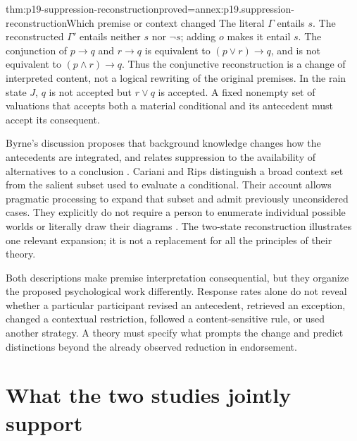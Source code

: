\begin{hblemma}{thm:p19-suppression-reconstruction}{proved=annex:p19.suppression-reconstruction}{Which premise or context changed}
The literal \(\Gamma\) entails \(s\). The reconstructed \(\Gamma'\)
entails neither \(s\) nor \(\neg s\); adding \(o\) makes it entail
\(s\). The conjunction of \(p\to q\) and \(r\to q\) is equivalent
to \((p\lor r)\to q\), and is not equivalent to
\((p\land r)\to q\). Thus the conjunctive reconstruction is a change
of interpreted content, not a logical rewriting of the original premises.
In the rain state \(J\), \(q\) is not accepted but \(r\lor q\) is
accepted. A fixed nonempty set of valuations that accepts both a material
conditional and its antecedent must accept its consequent.
\end{hblemma}

Byrne's discussion proposes that background knowledge changes how the
antecedents are integrated, and relates suppression to the availability
of alternatives to a conclusion \cite[pp.~76--79]{Byrne1989Suppression}.
Cariani and Rips distinguish a broad context set from the salient subset
used to evaluate a conditional. Their account allows pragmatic processing
to expand that subset and admit previously unconsidered cases. They
explicitly do not require a person to enumerate individual possible
worlds or literally draw their diagrams
\cite[Secs.~3.1--4.2, 5.1--5.2]{CarianiRips2017Suppression}.
The two-state reconstruction illustrates one relevant expansion; it is
not a replacement for all the principles of their theory.

Both descriptions make premise interpretation consequential, but they
organize the proposed psychological work differently. Response rates alone
do not reveal whether a particular participant revised an antecedent,
retrieved an exception, changed a contextual restriction, followed a
content-sensitive rule, or used another strategy. A theory must specify
what prompts the change and predict distinctions beyond the already
observed reduction in endorsement.

\section{What the two studies jointly support}
\label{sec:p19-suppression-comparison}

